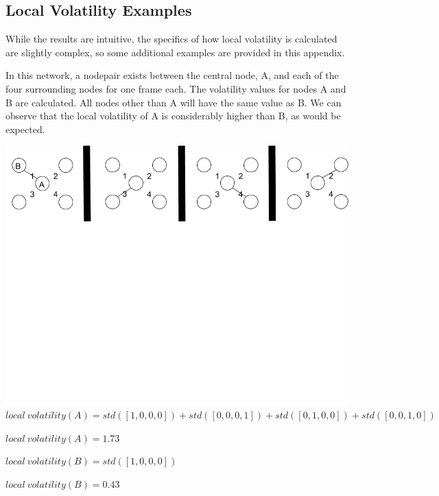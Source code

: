 \documentclass[oneside,12pt]{Classes/RoboticsLaTeX}
\begin{document}
\appendix
%
%

\renewcommand{\bibname}{References}           %
\nocite{*}
\begin{appendices}
\chapter{Local Volatility Examples}

While the results are intuitive, the specifics of how local volatility is calculated are slightly complex, so some additional examples are provided in this appendix.

\label{appendix:appendixA}
In this network, a nodepair exists between the central node, A, and each of the four surrounding nodes for one frame each. The volatility values for nodes A and B are calculated. All nodes other than A will have the same value as B. We can observe that the local volatility of A is considerably higher than B, as would be expected.
\begin{center}
\includegraphics[trim={0 15cm 0 0}, width=140mm]{./Figures/volatilityAppendix1.png}
$local\ volatility(A) = std([1,0,0,0]) + std([0,0,0,1]) + std([0,1,0,0]) + std([0,0,1,0])$

$local\ volatility(A) = 1.73$

$local\ volatility(B) = std([1,0,0,0])$

$local\ volatility(B) = 0.43$
\end{center}


\end{appendices}
\end{document}
